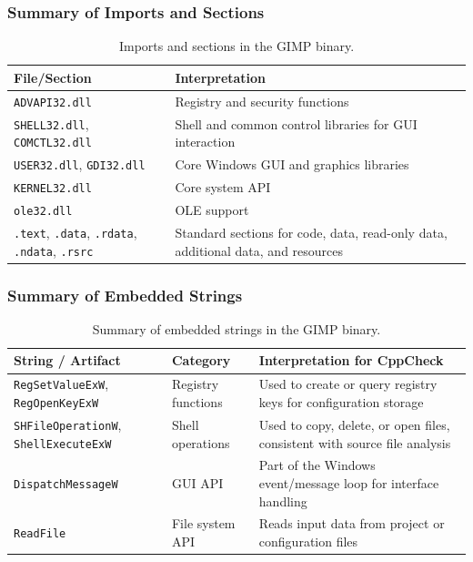 \documentclass{article}
\begin{document}
\subsubsection{Summary of Imports and Sections}
\begin{table}[H]
  \centering
  \caption{Imports and sections in the GIMP binary.}
  \label{tab:pro-imports}
  \begin{tabular}{|p{4cm}|p{8cm}|}
    \hline
    \textbf{File/Section} & \textbf{Interpretation} \\
    \hline
    \texttt{ADVAPI32.dll} & Registry and security functions \\
    \hline
    \texttt{SHELL32.dll}, \texttt{COMCTL32.dll} & Shell and common control libraries for GUI interaction \\
    \hline
    \texttt{USER32.dll}, \texttt{GDI32.dll} & Core Windows GUI and graphics libraries \\
    \hline
    \texttt{KERNEL32.dll} & Core system API \\
    \hline
    \texttt{ole32.dll} & OLE support \\
    \hline
    \texttt{.text}, \texttt{.data}, \texttt{.rdata}, \texttt{.ndata}, \texttt{.rsrc} & Standard sections for code, data, read-only data, additional data, and resources \\
    \hline
  \end{tabular}
\end{table}

\subsubsection{Summary of Embedded Strings}
\begin{table}[H]
  \centering
  \begin{tabular}{|p{5cm}|p{3cm}|p{7cm}|}
    \hline
    \textbf{String / Artifact} & \textbf{Category} & \textbf{Interpretation for CppCheck} \\
    \hline
    \texttt{RegSetValueExW}, \texttt{RegOpenKeyExW} & Registry functions & Used to create or query registry keys for configuration storage \\
    \hline
    \texttt{SHFileOperationW}, \texttt{ShellExecuteExW} & Shell operations & Used to copy, delete, or open files, consistent with source file analysis \\
    \hline
    \texttt{DispatchMessageW} & GUI API & Part of the Windows event/message loop for interface handling \\
    \hline
    \texttt{ReadFile} & File system API & Reads input data from project or configuration files \\
    \hline
  \end{tabular}
  \caption{Summary of embedded strings in the GIMP binary.}
  \label{tab:gimp-strings}
\end{table}
\end{document}
